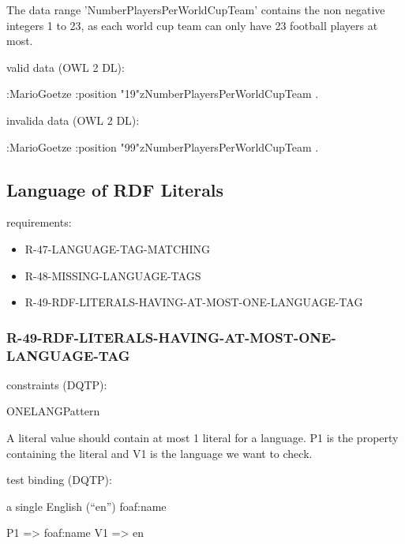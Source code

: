 \documentclass{llncs}
\begin{document}
The data range 'NumberPlayersPerWorldCupTeam' contains the non negative integers 1 to 23, as each world cup team can only have 23 football players at most.

valid data (OWL 2 DL):

\begin{ex}
:MarioGoetze
    :position "19"^^:NumberPlayersPerWorldCupTeam .
\end{ex}

invalida data (OWL 2 DL):

\begin{ex}
:MarioGoetze
    :position "99"^^:NumberPlayersPerWorldCupTeam .
\end{ex}

\subsection{Language of RDF Literals}

requirements:

\begin{itemize}
	\item R-47-LANGUAGE-TAG-MATCHING
  \item R-48-MISSING-LANGUAGE-TAGS
	\item R-49-RDF-LITERALS-HAVING-AT-MOST-ONE-LANGUAGE-TAG
\end{itemize}

\subsubsection{R-49-RDF-LITERALS-HAVING-AT-MOST-ONE-LANGUAGE-TAG} 

constraints (DQTP):

ONELANGPattern \cite{Kontokostas2014} 

A literal value should contain at most
1 literal for a language. P1 is the property containing the
literal and V1 is the language we want to check.


test binding (DQTP):

a single English (“en”) foaf:name

\begin{ex}
P1 => foaf:name
V1 => en
\end{ex}
\end{document}
